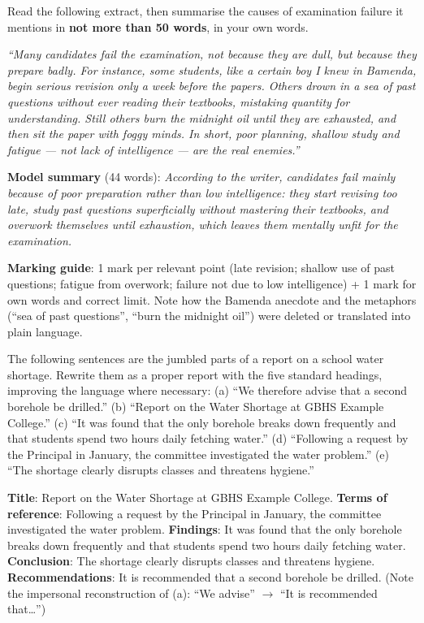 \documentclass[11pt]{article}
\begin{document}
\begin{exercice}
Read the following extract, then summarise the causes of examination failure it mentions in \textbf{not more than 50 words}, in your own words.

\emph{``Many candidates fail the examination, not because they are dull, but because they prepare badly. For instance, some students, like a certain boy I knew in Bamenda, begin serious revision only a week before the papers. Others drown in a sea of past questions without ever reading their textbooks, mistaking quantity for understanding. Still others burn the midnight oil until they are exhausted, and then sit the paper with foggy minds. In short, poor planning, shallow study and fatigue --- not lack of intelligence --- are the real enemies.''}
\end{exercice}

\begin{corrige}[Exercise 1]
\textbf{Model summary} (44 words): \emph{According to the writer, candidates fail mainly because of poor preparation rather than low intelligence: they start revising too late, study past questions superficially without mastering their textbooks, and overwork themselves until exhaustion, which leaves them mentally unfit for the examination.}

\textbf{Marking guide}: 1 mark per relevant point (late revision; shallow use of past questions; fatigue from overwork; failure not due to low intelligence) + 1 mark for own words and correct limit. Note how the Bamenda anecdote and the metaphors (``sea of past questions'', ``burn the midnight oil'') were deleted or translated into plain language.
\end{corrige}

\begin{exercice}
The following sentences are the jumbled parts of a report on a school water shortage. Rewrite them as a proper report with the five standard headings, improving the language where necessary: (a) ``We therefore advise that a second borehole be drilled.'' (b) ``Report on the Water Shortage at GBHS Example College.'' (c) ``It was found that the only borehole breaks down frequently and that students spend two hours daily fetching water.'' (d) ``Following a request by the Principal in January, the committee investigated the water problem.'' (e) ``The shortage clearly disrupts classes and threatens hygiene.''
\end{exercice}

\begin{corrige}[Exercise 2]
\textbf{Title}: Report on the Water Shortage at GBHS Example College. \textbf{Terms of reference}: Following a request by the Principal in January, the committee investigated the water problem. \textbf{Findings}: It was found that the only borehole breaks down frequently and that students spend two hours daily fetching water. \textbf{Conclusion}: The shortage clearly disrupts classes and threatens hygiene. \textbf{Recommendations}: It is recommended that a second borehole be drilled. (Note the impersonal reconstruction of (a): ``We advise'' $\rightarrow$ ``It is recommended that\ldots'')
\end{corrige}
\end{document}
